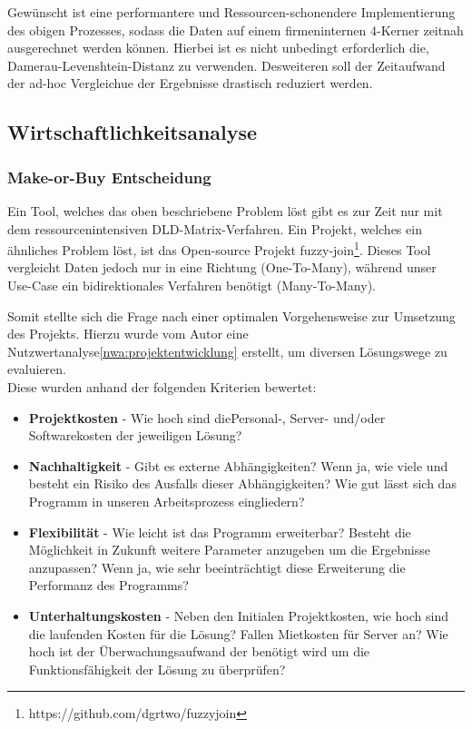 Gewünscht ist eine performantere und Ressourcen-schonendere Implementierung des obigen Prozesses,
sodass die Daten auf einem firmeninternen 4-Kerner zeitnah ausgerechnet werden können.
Hierbei ist es nicht unbedingt erforderlich die, Damerau-Levenshtein-Distanz zu verwenden. Desweiteren soll der Zeitaufwand der ad-hoc 
Vergleichue der Ergebnisse drastisch reduziert werden.\par




\subsection{Wirtschaftlichkeitsanalyse}
\subsubsection{Make-or-Buy Entscheidung}
Ein Tool, welches das oben beschriebene Problem löst gibt es zur Zeit nur mit dem
ressourcenintensiven DLD-Matrix-Verfahren. Ein Projekt, welches ein ähnliches
Problem löst, ist das Open-source Projekt fuzzy-join\footnote{https://github.com/dgrtwo/fuzzyjoin}.
Dieses Tool vergleicht Daten jedoch nur in eine Richtung (One-To-Many), während unser
Use-Case ein bidirektionales Verfahren benötigt (Many-To-Many).\par

Somit stellte sich die Frage nach einer optimalen Vorgehensweise zur Umsetzung des
Projekts. Hierzu wurde vom Autor eine Nutzwertanalyse\ref{nwa:projektentwicklung} erstellt, um diversen Lösungswege zu evaluieren. \\
Diese wurden anhand der folgenden Kriterien bewertet:


\begin{itemize}
    \item \textbf{Projektkosten} - Wie hoch sind diePersonal-, Server- und/oder Softwarekosten der jeweiligen Lösung?

    \item \textbf{Nachhaltigkeit} - Gibt es externe Abhängigkeiten? Wenn ja, wie viele und besteht ein Risiko des Ausfalls dieser Abhängigkeiten? Wie gut lässt sich das Programm in unseren Arbeitsprozess eingliedern? 

    \item \textbf{Flexibilität} - Wie leicht ist das Programm erweiterbar? Besteht die Möglichkeit in Zukunft weitere Parameter anzugeben um die Ergebnisse anzupassen? Wenn ja, wie sehr beeinträchtigt diese Erweiterung die Performanz des Programms?

    \item \textbf{Unterhaltungskosten} - Neben den Initialen Projektkosten, wie hoch sind die laufenden Kosten für die Lösung? Fallen Mietkosten für Server an? Wie hoch ist der Überwachungsaufwand der benötigt wird um die Funktionsfähigkeit der Lösung zu überprüfen?

\end{itemize}



